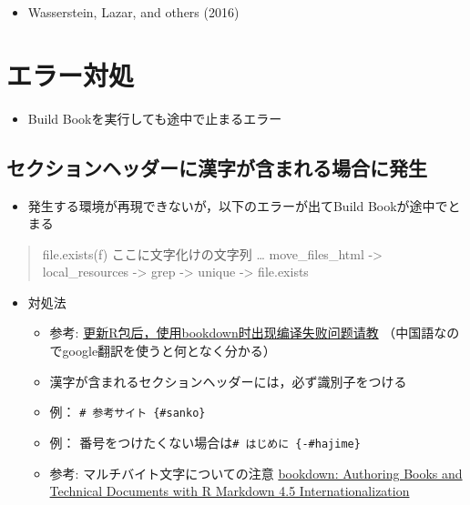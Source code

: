 \documentclass[xelatex, ja=standard, b5paper]{bxjsbook}
\providecommand{\tightlist}{%
  \setlength{\itemsep}{0pt}\setlength{\parskip}{0pt}}
\begin{document}
\begin{itemize}
\tightlist
\item
  Wasserstein, Lazar, and others (2016)
\end{itemize}

\hypertarget{error}{%
\chapter{エラー対処}\label{error}}

\begin{itemize}
\tightlist
\item
  Build Bookを実行しても途中で止まるエラー
\end{itemize}

\hypertarget{error_kanji}{%
\section{セクションヘッダーに漢字が含まれる場合に発生}\label{error_kanji}}

\begin{itemize}
\tightlist
\item
  発生する環境が再現できないが，以下のエラーが出てBuild Bookが途中でとまる
\end{itemize}

\begin{quote}
file.exists(f) ここに文字化けの文字列 \ldots{} move\_files\_html -\textgreater{} local\_resources -\textgreater{} grep -\textgreater{} unique -\textgreater{} file.exists
\end{quote}

\begin{itemize}
\tightlist
\item
  対処法

  \begin{itemize}
  \tightlist
  \item
    参考: \href{https://d.cosx.org/d/420961-r-bookdown}{更新R包后，使用bookdown时出现编译失败问题请教} （中国語なのでgoogle翻訳を使うと何となく分かる）
  \item
    漢字が含まれるセクションヘッダーには，必ず識別子をつける
  \item
    例： \texttt{\#\ 参考サイト\ \{\#sanko\}}
  \item
    例： 番号をつけたくない場合は\texttt{\#\ はじめに\ \{-\#hajime\}}
  \item
    参考: マルチバイト文字についての注意 \href{https://bookdown.org/yihui/bookdown/internationalization.html}{bookdown: Authoring Books and Technical Documents with R Markdown 4.5 Internationalization}
  \end{itemize}
\end{itemize}
\end{document}
